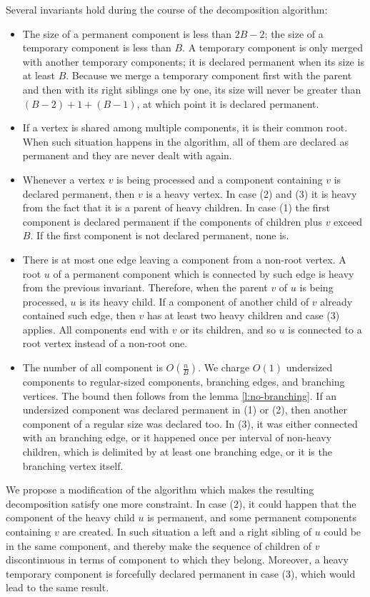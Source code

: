 Several invariants hold during the course of the decomposition algorithm:
\begin{itemize}
	\item The size of a permanent component is less than $2 B - 2$; the size of a temporary component is less than $B$.
	A temporary component is only merged with another temporary components; it is declared permanent when its size is at least $B$.
	Because we merge a temporary component first with the parent and then with its right siblings one by one, its size will never be greater than $(B - 2) + 1 + (B - 1)$, at which point it is declared permanent.
	\item If a vertex is shared among multiple components, it is their common root.
	When such situation happens in the algorithm, all of them are declared as permanent and they are never dealt with again.
	\item Whenever a vertex $v$ is being processed and a component containing $v$ is declared permanent, then $v$ is a heavy vertex.
	In case (2) and (3) it is heavy from the fact that it is a parent of heavy children.
	In case (1) the first component is declared permanent if the components of children plus $v$ exceed $B$.
	If the first component is not declared permanent, none is.
	\item There is at most one edge leaving a component from a non-root vertex.
	A root $u$ of a permanent component which is connected by such edge is heavy from the previous invariant.
	Therefore, when the parent $v$ of $u$ is being processed, $u$ is its heavy child.
	If a component of another child of $v$ already contained such edge, then $v$ has at least two heavy children and case (3) applies.
	All components end with $v$ or its children, and so $u$ is connected to a root vertex instead of a non-root one.
	\item The number of all component is $O\left(\frac{n}{B}\right)$.
	We charge $O(1)$ undersized components to regular-sized components, branching edges, and branching vertices.
	The bound then follows from the lemma \ref{l:no-branching}.
	If an undersized component was declared permanent in (1) or (2), then another component of a regular size was declared too.
	In (3), it was either connected with an branching edge, or it happened once per interval of non-heavy children, which is delimited by at least one branching edge, or it is the branching vertex itself.
\end{itemize}

\bigbreak

We propose a modification of the algorithm which makes the resulting decomposition satisfy one more constraint.
In case (2), it could happen that the component of the heavy child $u$ is permanent, and some permanent components containing $v$ are created.
In such situation a left and a right sibling of $u$ could be in the same component, and thereby make the sequence of children of $v$ discontinuous in terms of component to which they belong.
Moreover, a heavy temporary component is forcefully declared permanent in case (3), which would lead to the same result.

